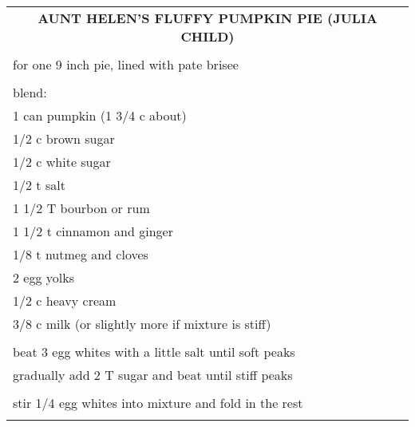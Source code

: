 \documentclass[8pt]{report}
\begin{document}
\newpage

\centering

\begin{tabular}{|l|} \hline	%
 
\multicolumn{1}{|c|}{\textbf{AUNT HELEN'S FLUFFY PUMPKIN PIE (JULIA CHILD)}}
\\
\\

\index{desserts!aunt helen's fluffy pumpkin pie (julia child)}
\index{aunt helen's fluffy pumpkin pie}
\index{pumpkin pie!aunt helen's fluffy} \index{pie!pumpkin}

for one 9 inch pie, lined with pate brisee\\
\\
blend:\\
\hspace{0.5 in}	1 can pumpkin (1 3/4 c about)\\
\hspace{0.5 in}	1/2 c brown sugar\\
\hspace{0.5 in}	1/2 c white sugar\\
\hspace{0.5 in}	1/2 t salt\\
\hspace{0.5 in}	1 1/2 T bourbon or rum\\
\hspace{0.5 in}	1 1/2 t cinnamon and ginger\\
\hspace{0.5 in}	1/8 t nutmeg and cloves\\
\hspace{0.5 in}	2 egg yolks\\
\hspace{0.5 in}	1/2 c heavy cream\\
\hspace{0.5 in}	3/8 c milk (or slightly more if mixture is stiff)\\
\\
beat 3 egg whites with a little salt until soft peaks\\
gradually add 2 T sugar and beat until stiff peaks\\
\\
stir 1/4 egg whites into mixture and fold in the rest\\
\\

\end{tabular}
\end{document}
